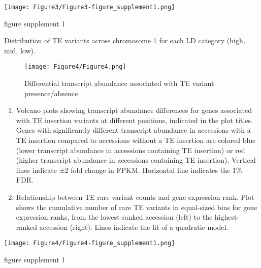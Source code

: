 \documentclass[12pt]{article}
\begin{document}

\setcounter{suppfigure}{2}

\begin{suppfigure}
  \centering
  \texttt{[image: Figure3/Figure3-figure\_supplement1.png]}
  \caption{figure supplement 1}
  \label{fig3s1}
\end{suppfigure}

Distribution of TE variants across chromosome 1 for each LD category
(high, mid, low).

\pagebreak


\begin{figure}
  \centering
  \texttt{[image: Figure4/Figure4.png]}
  \caption{Differential transcript abundance associated with TE variant presence/absence}
  \label{fig4}
\end{figure}

\begin{enumerate}
\def\labelenumi{(\Alph{enumi})}
\item
  Volcano plots showing transcript abundance differences for genes
  associated with TE insertion variants at different positions,
  indicated in the plot titles. Genes with significantly different
  transcript abundance in accessions with a TE insertion compared to
  accessions without a TE insertion are colored blue (lower transcript
  abundance in accessions containing TE insertion) or red (higher
  transcript abundance in accessions containing TE insertion). Vertical
  lines indicate ±2 fold change in FPKM. Horizontal line indicates the
  1\% FDR.
\item
  Relationship between TE rare variant counts and gene expression rank.
  Plot shows the cumulative number of rare TE variants in equal-sized
  bins for gene expression ranks, from the lowest-ranked accession
  (left) to the highest-ranked accession (right). Lines indicate the fit
  of a quadratic model.
\end{enumerate}

\pagebreak


\setcounter{suppfigure}{3}

\begin{suppfigure}
  \centering
  \texttt{[image: Figure4/Figure4-figure\_supplement1.png]}
  \caption{figure supplement 1}
  \label{fig4s1}
\end{suppfigure}
\end{document}
